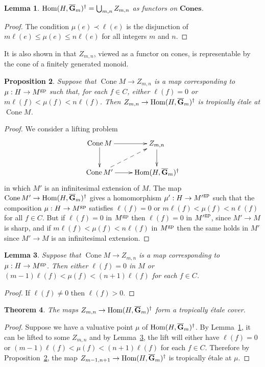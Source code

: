 \documentclass[12pt]{amsart}
\newtheorem{theorem}{Theorem}
\newtheorem{proposition}[theorem]{Proposition}
\newtheorem{lemma}[theorem]{Lemma}
\theoremstyle{definition}
\theoremstyle{remark}
\def\Hom{\operatorname{Hom}}
\def\Cone{\operatorname{Cone}}
\def\Cones{\mathbf{Cones}}
\def\overnorm#1{\overline{#1}\vphantom{#1}}
\def\ologGm{\overnorm{\mathbf G}_m}
\begin{document}
\begin{lemma} \label{lem:cover}
$\Hom(H, \ologGm)^\dagger = \bigcup_{m,n} Z_{m,n}$ as functors on $\Cones$.
\end{lemma}
\begin{proof}
The condition $\mu(e) \prec \ell(e)$ is the disjunction of $m \ell(e) \leq \mu(e) \leq n \ell(e)$ for all integers $m$ and $n$.
\end{proof}

It is also shown in \cite[Lemma~3.10.3.2]{logpic} that $Z_{m,n}$, viewed as a functor on cones, is representable by the cone of a finitely generated monoid.

\begin{proposition} \label{prop:Z-etale}
Suppose that $\Cone M \to Z_{m,n}$ is a map corresponding to $\mu : H \to M^{\rm gp}$ such that, for each $f \in C$, either $\ell(f) = 0$ or $m \ell(f) < \mu(f) < n \ell(f)$.  Then $Z_{m,n} \to \Hom(H, \ologGm)^\dagger$ is tropically \'etale at $\Cone M$.
\end{proposition}
\begin{proof}
We consider a lifting problem
\begin{equation} \vcenter{\xymatrix{
\Cone M \ar[r] \ar[d] & Z_{m,n} \ar[d] \\
\Cone M' \ar@{-->}[ur] \ar[r] &  \Hom(H, \ologGm)^\dagger
}} \end{equation}
in which $M'$ is an infinitesimal extension of $M$.  The map $\Cone M' \to \Hom(H, \ologGm)^\dagger$ gives a homomorphism $\mu' : H \to {M'}^{\rm gp}$ such that the composition $\mu : H \to M^{\rm gp}$ satisfies $\ell(f) = 0$ or $m \ell(f) < \mu(f) < n \ell(f)$ for all $f \in C$.  But if $\ell(f) = 0$ in $M^{\rm gp}$ then $\ell(f) = 0$ in ${M'}^{\rm gp}$, since $M' \to M$ is sharp, and if $m \ell(f) < \mu(f) < n \ell(f)$ in $M^{\rm gp}$ then the same holds in $M'$ since $M' \to M$ is an infinitesimal extension.
\end{proof}

\begin{lemma} \label{lem:add-one}
Suppose that $\Cone M \to Z_{m,n}$ is a map corresponding to $\mu : H \to M^{\rm gp}$.  Then either $\ell(f) = 0$ in $M$ or $(m-1) \ell(f) < \mu(f) < (n+1) \ell(f)$ for each $f \in C$.
\end{lemma}
\begin{proof}
If $\ell(f) \neq 0$ then $\ell(f) > 0$.
\end{proof}

\begin{theorem}
The maps $Z_{m,n} \to \Hom(H, \ologGm)^\dagger$ form a tropically \'etale cover.
\end{theorem}
\begin{proof}
Suppose we have a valuative point $\mu$ of $\Hom(H, \ologGm)^\dagger$.  By Lemma~\ref{lem:cover}, it can be lifted to some $Z_{m,n}$ and by Lemma~\ref{lem:add-one}, the lift will either have $\ell(f) = 0$ or $(m-1) \ell(f) < \mu(f) < (n+1) \ell(f)$ for each $f \in C$.  Therefore by Proposition~\ref{prop:Z-etale}, the map $Z_{m-1,n+1} \to \Hom(H, \ologGm)^\dagger$ is tropically \'etale at $\mu$.
\end{proof}
\end{document}
